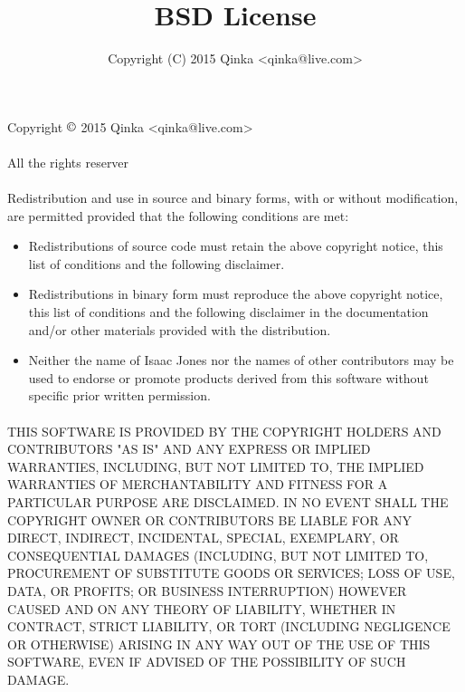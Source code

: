 \documentclass[UTF8]{ctexart}
\title{BSD License}
\author{Copyright (C) 2015 Qinka <qinka@live.com> }
\begin{document}
\maketitle
\newpage
\paragraph*{}
  Copyright  $\copyright$ 2015 Qinka <qinka@live.com>
\paragraph*{}
  All the rights reserver
\paragraph*{}
  Redistribution and use in source and binary forms, with or without
modification, are permitted provided that the following conditions are
met:
\begin{itemize}
  \item Redistributions of source code must retain the above copyright
      notice, this list of conditions and the following disclaimer.
  \item Redistributions in binary form must reproduce the above
      copyright notice, this list of conditions and the following
      disclaimer in the documentation and/or other materials provided
      with the distribution.
  \item Neither the name of Isaac Jones nor the names of other
      contributors may be used to endorse or promote products derived
      from this software without specific prior written permission.
\end{itemize}
\paragraph*{}
THIS SOFTWARE IS PROVIDED BY THE COPYRIGHT HOLDERS AND CONTRIBUTORS
"AS IS" AND ANY EXPRESS OR IMPLIED WARRANTIES, INCLUDING, BUT NOT
LIMITED TO, THE IMPLIED WARRANTIES OF MERCHANTABILITY AND FITNESS FOR
A PARTICULAR PURPOSE ARE DISCLAIMED. IN NO EVENT SHALL THE COPYRIGHT
OWNER OR CONTRIBUTORS BE LIABLE FOR ANY DIRECT, INDIRECT, INCIDENTAL,
SPECIAL, EXEMPLARY, OR CONSEQUENTIAL DAMAGES (INCLUDING, BUT NOT
LIMITED TO, PROCUREMENT OF SUBSTITUTE GOODS OR SERVICES; LOSS OF USE,
DATA, OR PROFITS; OR BUSINESS INTERRUPTION) HOWEVER CAUSED AND ON ANY
THEORY OF LIABILITY, WHETHER IN CONTRACT, STRICT LIABILITY, OR TORT
(INCLUDING NEGLIGENCE OR OTHERWISE) ARISING IN ANY WAY OUT OF THE USE
OF THIS SOFTWARE, EVEN IF ADVISED OF THE POSSIBILITY OF SUCH DAMAGE.
\end{document}
